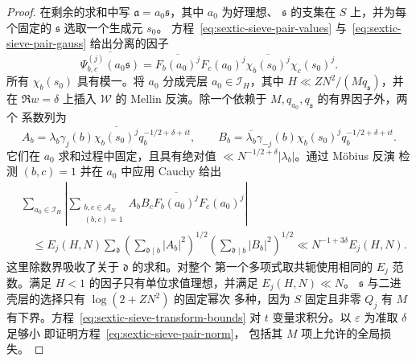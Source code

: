 \documentclass[11pt,a4paper]{article}
\numberwithin{equation}{section}
\numberwithin{figure}{section}
\theoremstyle{definition}
\theoremstyle{remark}
\begin{document}
\begin{proof}
在剩余的求和中写 $\mathfrak a=a_0\mathfrak s$，其中 $a_0$ 为好理想、
$\mathfrak s$ 的支集在 $S$ 上，并为每个固定的 $\mathfrak s$ 选取一个生成元 $s_0$。
方程~\eqref{eq:sextic-sieve-pair-values}
与~\eqref{eq:sextic-sieve-pair-gauss} 给出分离的因子
\[
 \overline{\Psi_{b,c}^{(j)}(a_0\mathfrak s)}
 =\overline{F_b(a_0)^j}F_c(a_0)^j
       \overline{\chi_b(s_0)^j}\chi_c(s_0)^j.
\]
所有 $\chi_b(s_0)$ 具有模一。将 $a_0$ 分成壳层
$a_0\in\mathcal I_H$，其中 $H\ll ZN^2/(Mq_{\mathfrak s})$，并
在 $\Re w=\delta$ 上插入 $\mathscr W$ 的
Mellin 反演。除一个依赖于
$M,q_{a_0},q_{\mathfrak s}$ 的有界因子外，两个
系数列为
\[
 A_b=\lambda_b\gamma_j(b)\overline{\chi_b(s_0)^j}
                    q_b^{-1/2+\delta+it},\qquad
 B_b=\overline{\lambda_b}\gamma_{-j}(b)\chi_b(s_0)^j
                    q_b^{-1/2+\delta+it}.
\]
它们在 $a_0$ 求和过程中固定，且具有绝对值
$\ll N^{-1/2+\delta}|\lambda_b|$。通过 M\"obius 反演
检测 $(b,c)=1$ 并在 $a_0$ 中应用 Cauchy 给出
\begin{align*}
 &\sum_{a_0\in\mathcal I_H}
  \left|\sum_{\substack{b,c\in\mathcal A_N\\(b,c)=1}}
       A_bB_c\overline{F_b(a_0)^j}F_c(a_0)^j\right|\\
 &\quad\le E_j(H,N)\sum_{\mathfrak d}
   \left(\sum_{\mathfrak d\mid b}|A_b|^2\right)^{1/2}
   \left(\sum_{\mathfrak d\mid b}|B_b|^2\right)^{1/2}
 \ll N^{-1+3\delta}E_j(H,N).
\end{align*}
这里除数界吸收了关于 $\mathfrak d$ 的求和。对整个
第一个多项式取共轭使用相同的 $E_j$ 范数。满足
$H<1$ 的因子只有单位求值理想，并满足 $E_j(H,N)\ll N$。
$\mathfrak s$ 与二进壳层的选择只有 $\log(2+ZN^2)$ 的固定幂次
多种，因为 $S$ 固定且非零
$Q_j$ 有 $M$ 有下界。方程~\eqref{eq:sextic-sieve-transform-bounds}
对 $t$ 变量求积分。以 $\varepsilon$ 为准取 $\delta$ 足够小
即证明方程~\eqref{eq:sextic-sieve-pair-norm}，
包括其 $M$ 项上允许的全局损失。


\end{proof}
\end{document}
